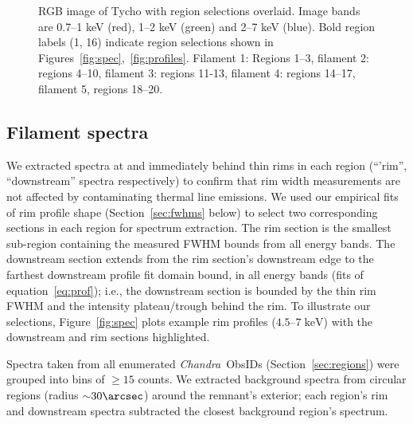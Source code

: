 \documentclass[manuscript]{aastex}  %
\newcommand*{\mt}{\mathrm}
\newcommand*{\unit}[1]{\;\mt{#1}}  %
\newcommand*{\abt}{\mathord{\sim}} %
\newcommand*{\Chandra}{\textit{Chandra}\ }
\begin{document}
\begin{figure}
    \centering
    \iftoggle{manuscript}{
        \texttt{[image: figures/snr.pdf]}
    }{
        \plotone{figures/snr.pdf}
    }
    \caption{RGB image of Tycho with region selections overlaid.  Image bands
    are 0.7--1 keV (red), 1--2 keV (green) and 2--7 keV (blue).  Bold region
    labels (1, 16) indicate region selections shown in
    Figures~\ref{fig:spec},~\ref{fig:profiles}.  Filament 1: Regions 1--3,
    filament 2: regions 4--10, filament 3: regions 11-13, filament 4:
    regions 14--17, filament 5, regions 18--20.
    \label{fig:snr}}
\end{figure}

\subsection{Filament spectra}
\label{sec:spec}

We extracted spectra at and immediately behind thin rims in each region
(``'rim'', ``downstream'' spectra respectively) to confirm that rim width
measurements are not affected by contaminating thermal line emissions.  We
used our empirical fits of rim profile shape (Section~\ref{sec:fwhms} below)
to select two corresponding sections in each region for spectrum extraction.
The rim section is the smallest sub-region containing the measured FWHM bounds
from all energy bands.  The downstream section extends from the rim section's
downstream edge to the farthest downstream profile fit domain bound, in all
energy bands (fits of equation~\eqref{eq:prof}); i.e., the downstream section
is bounded by the thin rim FWHM and the intensity plateau/trough behind the
rim.  To illustrate our selections, Figure~\ref{fig:spec} plots example rim
profiles ($4.5$--$7 \unit{keV}$) with the downstream and rim sections
highlighted.

Spectra taken from all enumerated \Chandra ObsIDs (Section~\ref{sec:regions})
were grouped into bins of $\geq 15$ counts.  We extracted background spectra
from circular regions (radius $\abt 30\arcsec$) around the remnant's exterior;
each region's rim and downstream spectra subtracted the closest background
region's spectrum.
\end{document}
